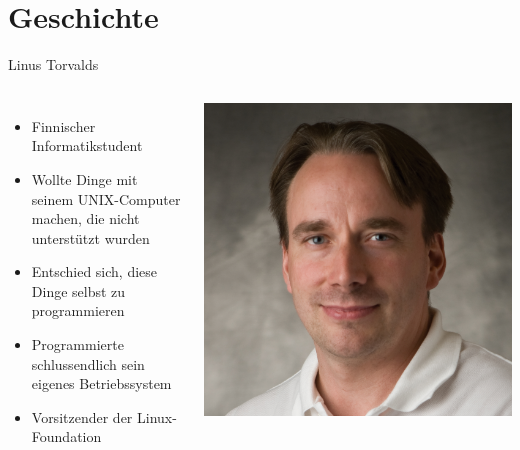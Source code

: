 \documentclass[10pt]{beamer}
\begin{document}
\section{Geschichte}
\begin{frame}{Linus Torvalds}
	\begin{columns}
		 	\begin{itemize}[<+- | alert@+>]
		 		\item Finnischer Informatikstudent
		 		\item Wollte Dinge mit seinem UNIX-Computer machen, die nicht unterstützt wurden
		 		\item Entschied sich, diese Dinge selbst zu programmieren
		 		\item Programmierte schlussendlich sein eigenes Betriebssystem
		 		\item Vorsitzender der Linux-Foundation
		 	\end{itemize}
	 		\includegraphics[scale=0.25]{img/torvalds.png}
	\end{columns}
\end{frame}
\end{document}
